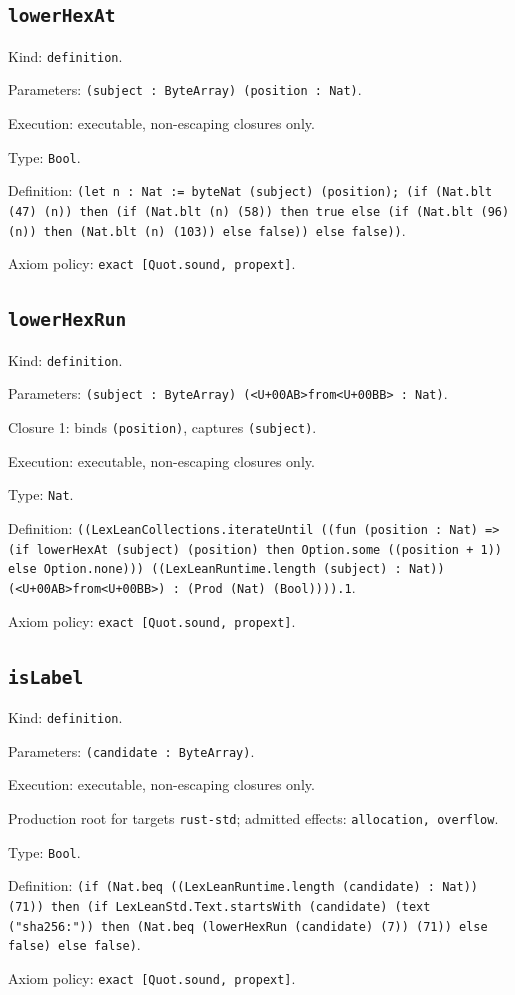 \documentclass[11pt]{article}
\begin{document}
\subsection*{\texttt{lowerHexAt}}
\noindent Kind: \texttt{definition}.\par
\noindent Parameters: \texttt{(subject : ByteArray) (position : Nat)}.\par
\noindent Execution: executable, non-escaping closures only.\par
\noindent Type: \texttt{Bool}.\par
\noindent Definition: \texttt{(let n : Nat := byteNat (subject) (position); (if (Nat.blt (47) (n)) then (if (Nat.blt (n) (58)) then true else (if (Nat.blt (96) (n)) then (Nat.blt (n) (103)) else false)) else false))}.\par
\noindent Axiom policy: \texttt{exact [Quot.sound, propext]}.\par
\subsection*{\texttt{lowerHexRun}}
\noindent Kind: \texttt{definition}.\par
\noindent Parameters: \texttt{(subject : ByteArray) (<U+00AB>from<U+00BB> : Nat)}.\par
\noindent Closure 1: binds \texttt{(position)}, captures \texttt{(subject)}.\par
\noindent Execution: executable, non-escaping closures only.\par
\noindent Type: \texttt{Nat}.\par
\noindent Definition: \texttt{((LexLeanCollections.iterateUntil ((fun (position : Nat) => (if lowerHexAt (subject) (position) then Option.some ((position + 1)) else Option.none))) ((LexLeanRuntime.length (subject) : Nat)) (<U+00AB>from<U+00BB>) : (Prod (Nat) (Bool)))).1}.\par
\noindent Axiom policy: \texttt{exact [Quot.sound, propext]}.\par
\subsection*{\texttt{isLabel}}
\noindent Kind: \texttt{definition}.\par
\noindent Parameters: \texttt{(candidate : ByteArray)}.\par
\noindent Execution: executable, non-escaping closures only.\par
\noindent Production root for targets \texttt{rust-std}; admitted effects: \texttt{allocation, overflow}.\par
\noindent Type: \texttt{Bool}.\par
\noindent Definition: \texttt{(if (Nat.beq ((LexLeanRuntime.length (candidate) : Nat)) (71)) then (if LexLeanStd.Text.startsWith (candidate) (text ("sha256:")) then (Nat.beq (lowerHexRun (candidate) (7)) (71)) else false) else false)}.\par
\noindent Axiom policy: \texttt{exact [Quot.sound, propext]}.\par
\end{document}
